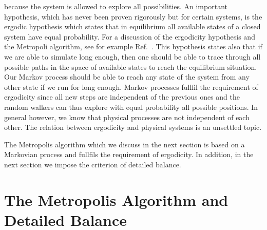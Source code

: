 because the system is allowed to explore all possibilities. An important hypothesis, which has never been proven rigorously
but for certain systems, is the ergodic hypothesis which states that in equilibrium all available states of a closed
system have equal probability. For a discussion of the ergodicity hypothesis and
the Metropoli algorithm, see for example Ref.~\cite{robertcasella}. 
This hypothesis states also that if we are able to simulate long enough, then one should be able to trace through all
possible paths in the space of available states to reach the equilibrium situation. 
Our Markov process should be able to reach any state of the system from any other state if we run for long enough.
Markov processes fullfil the requirement of ergodicity since all new steps are independent of the previous ones 
and the random walkers can thus explore with equal probability all possible positions. In general however, we know that
physical processes are not independent of each other. The relation between ergodicity and physical systems is an  
unsettled topic. 

The Metropolis algorithm which we discuss in the next section is based on a Markovian process and fullfils
the requirement of ergodicity. In addition, in the next section we impose the criterion of detailed balance.


\section{The Metropolis Algorithm and Detailed Balance}\label{sec:metropolis}


